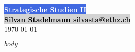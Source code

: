{}\documentclass[a4paper,landscape]{article}
\begin{document}
\begin{multicols}{4}

	\begin{center}
		\LARGE \textbf{\colorbox{RoyalBlue}{\textcolor{white}{Strategische Studien II}}} \\
		\normalsize
		\textbf{\colorbox{lightgray}{\textcolor{Black}{Silvan Stadelmann} \url{silvasta@ethz.ch}}}\\
		\today{}
		\footnotesize
	\end{center}

	\tableofcontents

	$body$
\end{multicols}
\end{document}
